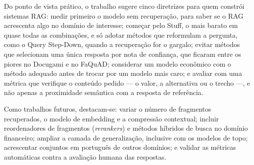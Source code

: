 Do ponto de vista prático, o trabalho sugere cinco diretrizes para quem constrói sistemas RAG: medir primeiro o modelo sem recuperação, para saber se o RAG acrescenta algo no domínio de interesse; começar pelo Stuff, o mais barato em quase todas as combinações, e só adotar métodos que reformulam a pergunta, como o Query Step-Down, quando a recuperação for o gargalo; evitar métodos que selecionam uma única resposta por nota de confiança, que ficaram entre os piores no Docugami e no FaQuAD; considerar um modelo econômico com o método adequado antes de trocar por um modelo mais caro; e avaliar com uma métrica que verifique o conteúdo pedido --- o valor, a alternativa ou o trecho ---, e não apenas a proximidade semântica com a resposta de referência.

Como trabalhos futuros, destacam-se: variar o número de fragmentos recuperados, o modelo de embedding e a compressão contextual; incluir reordenadores de fragmentos (\emph{rerankers}) e métodos híbridos de busca no domínio financeiro; ampliar a camada de generalização, inclusive com os modelos de topo; acrescentar conjuntos em português de outros domínios; e validar as métricas automáticas contra a avaliação humana das respostas.
